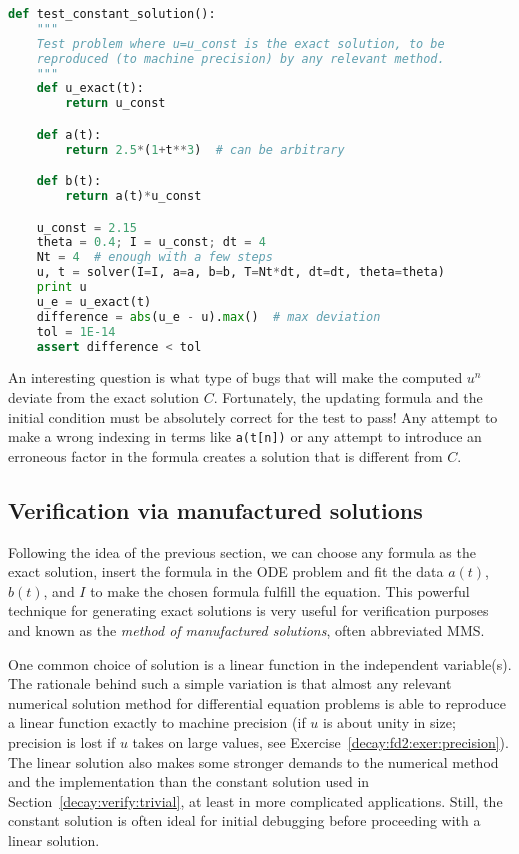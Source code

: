 \documentclass[graybox,sectrefs,envcountresetchap,open=right,final]{svmonodo}
\begin{document}
\begin{lstlisting}[language=Python,style=blue1_bluegreen]
def test_constant_solution():
    """
    Test problem where u=u_const is the exact solution, to be
    reproduced (to machine precision) by any relevant method.
    """
    def u_exact(t):
        return u_const

    def a(t):
        return 2.5*(1+t**3)  # can be arbitrary

    def b(t):
        return a(t)*u_const

    u_const = 2.15
    theta = 0.4; I = u_const; dt = 4
    Nt = 4  # enough with a few steps
    u, t = solver(I=I, a=a, b=b, T=Nt*dt, dt=dt, theta=theta)
    print u
    u_e = u_exact(t)
    difference = abs(u_e - u).max()  # max deviation
    tol = 1E-14
    assert difference < tol
\end{lstlisting}

An interesting question is what type of bugs that will make the
computed $u^n$ deviate from the exact solution $C$.
Fortunately, the updating formula and the initial condition must
be absolutely correct for the test to pass! Any attempt to make
a wrong indexing in terms like \texttt{a(t[n])} or any attempt to
introduce an erroneous factor in the formula creates a solution
that is different from $C$.


\subsection{Verification via manufactured solutions}
\label{decay:MMS}


Following the idea of the previous section, we can choose any formula
as the exact solution, insert the formula in the ODE problem and fit
the data $a(t)$, $b(t)$, and $I$ to make the chosen
formula fulfill the equation. This
powerful technique for generating exact solutions is very useful for
verification purposes and known as the \emph{method of manufactured
solutions}, often abbreviated MMS.

One common choice of solution is a linear function in the independent
variable(s). The rationale behind such a simple variation is that
almost any relevant numerical solution method for differential
equation problems is able to reproduce a linear function exactly to
machine precision (if $u$ is about unity in size; precision is lost if
$u$ takes on large values, see Exercise~\ref{decay:fd2:exer:precision}).
The linear solution also makes some stronger demands to the
numerical method and the implementation than the constant solution
used in Section~\ref{decay:verify:trivial}, at least in more
complicated applications. Still, the constant solution is often
ideal for initial debugging before proceeding with a linear solution.
\end{document}
